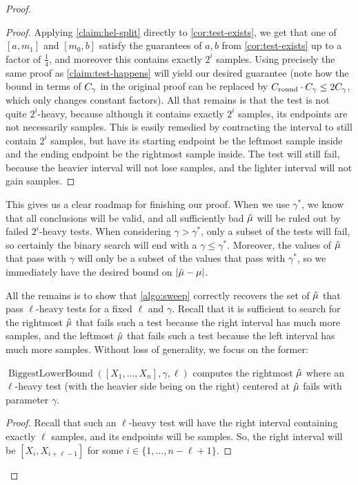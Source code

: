 \begin{proof}
\begin{proof}
        Applying \cref{claim:hel-split} directly to \cref{cor:test-exists}, we get that one of $[a,m_1]$ and $[m_0,b]$ satisfy the guarantees of $a,b$ from \cref{cor:test-exists} up to a factor of $\frac{1}{4}$, and moreover this contains exactly $2^i$ samples. Using precisely the same proof as \cref{claim:test-happens} will yield our desired guarantee (note how the bound in terms of $C_{\gamma}$ in the original proof can be replaced by $C_{\operatorname{round}} \cdot C_{\gamma} \le 2 C_{\gamma}$, which only changes constant factors). All that remains is that the test is not quite $2^i$-heavy, because although it contains exactly $2^i$ samples, its endpoints are not necessarily samples. This is easily remedied by contracting the interval to still contain $2^i$ samples, but have its starting endpoint be the leftmost sample inside and the ending endpoint be the rightmost sample inside. The test will still fail, because the heavier interval will not lose samples, and the lighter interval will not gain samples.
    \end{proof}

    This gives us a clear roadmap for finishing our proof. When we use $\gamma^*$, we know that all conclusions will be valid, and all sufficiently bad $\hat{\mu}$ will be ruled out by failed $2^i$-heavy tests. When considering $\gamma > \gamma^*$, only a subset of the tests will fail, so certainly the binary search will end with a $\gamma \le \gamma^*$. Moreover, the values of $\hat{\mu}$ that pass with $\gamma$ will only be a subset of the values that pass with $\gamma^*$, so we immediately have the desired bound on $|\hat{\mu} - \mu|$.

    All the remains is to show that \cref{algo:sweep} correctly recovers the set of $\hat{\mu}$ that pass $\ell$-heavy tests for a fixed $\ell$ and $\gamma$. Recall that it is sufficient to search for the rightmost $\hat{\mu}$ that fails such a test because the right interval has much more samples, and the leftmost $\hat{\mu}$ that fails such a test because the left interval has much more samples. Without loss of generality, we focus on the former:

    \begin{lemma}
        $\operatorname{BiggestLowerBound}([X_1,\dots,X_n],\gamma,\ell)$ computes the rightmost $\hat{\mu}$ where an $\ell$-heavy test (with the heavier side being on the right) centered at $\hat{\mu}$ fails with parameter $\gamma$.
    \end{lemma}
    \begin{proof}
        Recall that such an $\ell$-heavy test will have the right interval containing exactly $\ell$ samples, and its endpoints will be samples. So, the right interval will be $[X_i,X_{i+\ell-1}]$ for some $i \in \{1,\dots, n-\ell+1\}$. 
        

\end{proof}
\end{proof}

